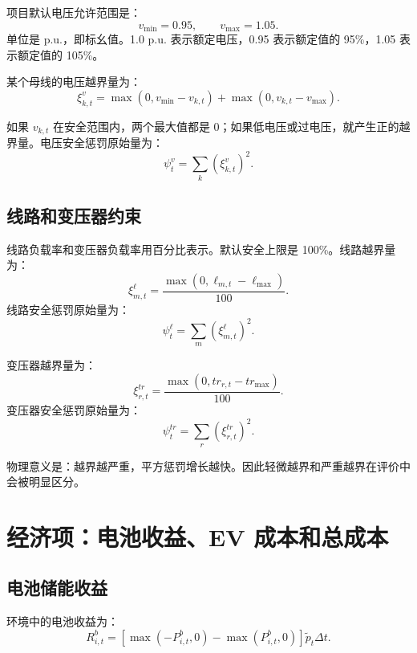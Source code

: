 \documentclass[UTF8,zihao=-4]{ctexart}
\begin{document}
项目默认电压允许范围是：
\begin{equation}
v_{\min}=0.95,\qquad v_{\max}=1.05.
\end{equation}
单位是 p.u.，即标幺值。1.0 p.u. 表示额定电压，0.95 表示额定值的 95\%，1.05 表示额定值的 105\%。

某个母线的电压越界量为：
\begin{equation}
\xi^v_{k,t}
=\max(0,v_{\min}-v_{k,t})+\max(0,v_{k,t}-v_{\max}).
\end{equation}

如果 $v_{k,t}$ 在安全范围内，两个最大值都是 0；如果低电压或过电压，就产生正的越界量。电压安全惩罚原始量为：
\begin{equation}
\psi^v_t=\sum_k(\xi^v_{k,t})^2.
\end{equation}

\subsection{线路和变压器约束}

线路负载率和变压器负载率用百分比表示。默认安全上限是 100\%。线路越界量为：
\begin{equation}
\xi^\ell_{m,t}
=\frac{\max(0,\ell_{m,t}-\ell_{\max})}{100}.
\end{equation}
线路安全惩罚原始量为：
\begin{equation}
\psi^\ell_t=\sum_m(\xi^\ell_{m,t})^2.
\end{equation}

变压器越界量为：
\begin{equation}
\xi^{tr}_{r,t}
=\frac{\max(0,tr_{r,t}-tr_{\max})}{100}.
\end{equation}
变压器安全惩罚原始量为：
\begin{equation}
\psi^{tr}_t=\sum_r(\xi^{tr}_{r,t})^2.
\end{equation}

物理意义是：越界越严重，平方惩罚增长越快。因此轻微越界和严重越界在评价中会被明显区分。

\section{经济项：电池收益、EV 成本和总成本}

\subsection{电池储能收益}

环境中的电池收益为：
\begin{equation}
R^b_{i,t}
=\left[\max(-P^b_{i,t},0)-\max(P^b_{i,t},0)\right]\tilde p_t\Delta t.
\end{equation}
\end{document}

